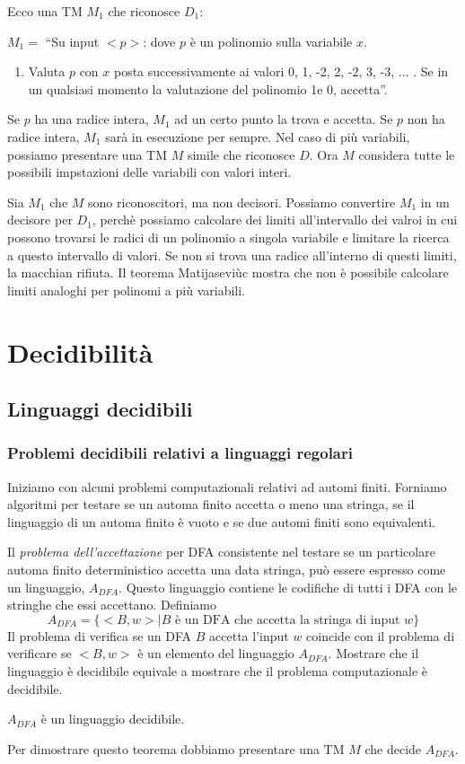\documentclass[12pt]{report}
\newcounter{theorem}
\begin{document}
Ecco una TM $M_1$ che riconosce $D_1$:

$M_1 = $ ``Su input $<p>$: dove $p$ è un polinomio sulla variabile $x$.
\begin{enumerate}
	\item Valuta $p$ con $x$ posta successivamente ai valori 0, 1, -2, 2, -2, 3, -3, $\dots$ . Se in un qualsiasi momento la valutazione del polinomio 1e 0, accetta''.
\end{enumerate}
Se $p$ ha una radice intera, $M_1$ ad un certo punto la trova e accetta. Se $p$ non ha radice intera, $M_1$ sarà in esecuzione per sempre. Nel caso di più variabili, possiamo presentare una TM $M$ simile che riconosce $D$. Ora $M$ considera tutte le possibili impstazioni delle variabili con valori interi.

Sia $M_1$ che $M$ sono riconoscitori, ma non decisori. Possiamo convertire $M_1$ in un decisore per $D_1$, perchè possiamo calcolare dei limiti all'intervallo dei valroi in cui possono trovarsi le radici di un polinomio a singola variabile e limitare la ricerca a questo intervallo di valori. Se non si trova una radice all'interno di questi limiti, la macchian rifiuta. Il teorema Matijaseviùc mostra che non è possibile calcolare limiti analoghi per polinomi a più variabili.
\chapter{Decidibilità}
\section{Linguaggi decidibili}
\subsection{Problemi decidibili relativi a linguaggi regolari}
Iniziamo con alcuni problemi computazionali relativi ad automi finiti. Forniamo algoritmi per testare se un automa finito accetta o meno una stringa, se il linguaggio di un automa finito è vuoto e se due automi finiti sono equivalenti.

Il \textit{problema dell'accettazione} per DFA consistente nel testare se un particolare automa finito deterministico accetta una data stringa, può essere espresso come un linguaggio, $A_{DFA}$. Questo linguaggio contiene le codifiche di tutti i DFA con le stringhe che essi accettano. Definiamo
\[
A_{DFA} = \{<B, w> \mid B \text{ è un DFA che accetta la stringa di input }w\}
\]
Il problema di verifica se un DFA $B$ accetta l'input $w$ coincide con il problema di verificare se $<B, w>$ è un elemento del linguaggio $A_{DFA}$. Mostrare che il linguaggio è decidibile equivale a mostrare che il problema computazionale è decidibile.
\begin{theorem}{}{}
$A_{DFA}$ è un linguaggio decidibile.
\end{theorem}
Per dimostrare questo teorema dobbiamo presentare una TM $M$ che decide $A_{DFA}$.
\end{document}
